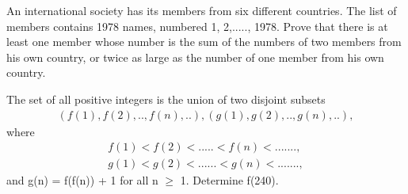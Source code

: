 \item An international society has its members from six different countries. The list of members contains 1978 names, numbered 1, 2,....., 1978. Prove that there is at least one member whose number is the sum of the numbers of two members from his own country, or twice as large as the number of one member from his own country.

\item The set of all positive integers is the union of two disjoint subsets
\begin{align*}
(f(1), f(2),.., f(n),..), (g(1), g(2),.., g(n),..),
\end{align*}
where
\begin{align*}
f(1) < f(2) < ..... < f(n) < .......,\\
g(1) < g(2) < ......< g(n) < .......,
\end{align*}
and
g(n) = f(f(n)) + 1 for all n $\geq$ 1.
Determine f(240).


